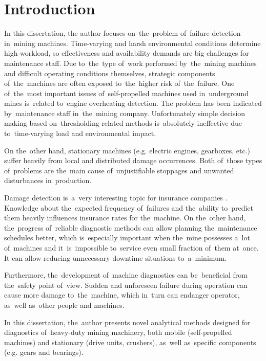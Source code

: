 \chapter{Introduction}

In this dissertation, the author focuses on~the~problem of~failure detection in~mining machines. Time-varying and harsh environmental conditions determine high workload, so effectiveness and availability demands are big challenges for maintenance staff. Due to~the~type of~work performed by~the~mining machines and difficult operating conditions themselves, strategic components of~the~machines are often exposed to~the~higher risk of~the~failure. One of~the~most important issues of~self-propelled machines used in~underground mines is~related to~engine overheating detection. The problem has been indicated by~maintenance staff in~the~mining company. Unfortunately simple decision making based on~thresholding-related methods is~absolutely ineffective due to~time-varying load and environmental impact.

On the~other hand, stationary machines (e.g. electric engines, gearboxes, etc.) suffer heavily from local and distributed damage occurrences. Both of~those types of~problems are the~main cause of~unjustifiable stoppages and unwanted disturbances in~production.

Damage detection is~a~very interesting topic for insurance companies \cite{gellermann2003requirements,lloyd2007richtlinien}. Knowledge about the~expected frequency of~failures and the~ability to~predict them heavily influences insurance rates for the~machine. On the~other hand, the~progress of~reliable diagnostic methods can allow planning the~maintenance schedules better, which is~especially important when the~mine possesses a~lot of~machines and it~is~impossible to~service even small fraction of~them at~once. It can allow reducing unnecessary downtime situations to~a~minimum.

Furthermore, the~development of~machine diagnostics can be~beneficial from the~safety point of~view. Sudden and unforeseen failure during operation can cause more damage to~the~machine, which in~turn can endanger operator, as~well as~other people and machines.

In this dissertation, the~author presents novel analytical methods designed for diagnostics of~heavy-duty mining machinery, both mobile (self-propelled machines) and stationary (drive units, crushers), as~well as~specific components (e.g. gears and bearings).